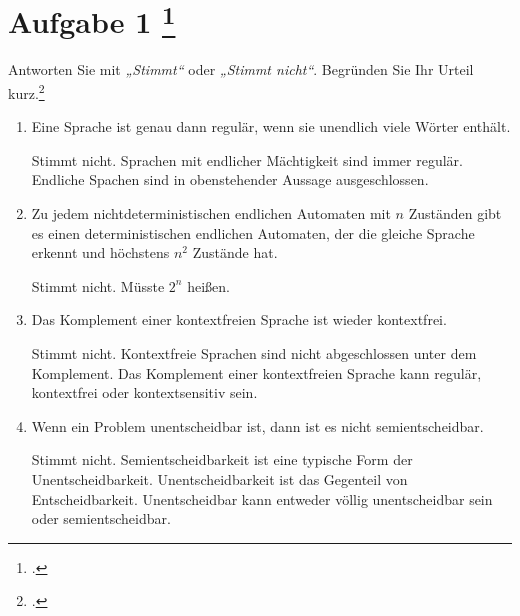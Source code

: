 \documentclass{lehramt-informatik-aufgabe}
\begin{document}
\section{Aufgabe 1
\footcite{examen:66115:2020:09}}

Antworten Sie mit \emph{„Stimmt“} oder \emph{„Stimmt nicht“}. Begründen
Sie Ihr Urteil kurz.\footcite[Seite 55-56]{theo:fs:4}


\begin{enumerate}


\item Eine Sprache ist genau dann regulär, wenn sie unendlich viele
Wörter enthält.

\begin{liAntwort}
Stimmt nicht. Sprachen mit endlicher Mächtigkeit sind immer regulär.
Endliche Spachen sind in obenstehender Aussage ausgeschlossen.
\end{liAntwort}


\item Zu jedem nichtdeterministischen endlichen Automaten mit $n$
Zuständen gibt es einen deterministischen endlichen Automaten, der die
gleiche Sprache erkennt und höchstens $n^2$ Zustände hat.

\begin{liAntwort}
Stimmt nicht. Müsste $2^n$ heißen.
\end{liAntwort}


\item Das Komplement einer kontextfreien Sprache ist wieder kontextfrei.

\begin{liAntwort}
Stimmt nicht. Kontextfreie Sprachen sind nicht abgeschlossen unter dem
Komplement. Das Komplement einer kontextfreien Sprache kann regulär,
kontextfrei oder kontextsensitiv sein.
\end{liAntwort}


\item Wenn ein Problem unentscheidbar ist, dann ist es nicht
semientscheidbar.

\begin{liAntwort}
Stimmt nicht. Semientscheidbarkeit ist eine typische Form der
Unentscheidbarkeit. Unentscheidbarkeit ist das Gegenteil von
Entscheidbarkeit. Unentscheidbar kann entweder völlig unentscheidbar
sein oder semientscheidbar.
\end{liAntwort}


\end{enumerate}
\end{document}
